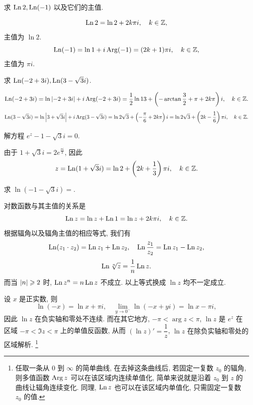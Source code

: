 \begin{example}
  求 $\operatorname{Ln} 2,\operatorname{Ln}(-1)$ 以及它们的主值.
\end{example}

\begin{solution}
  \[\operatorname{Ln}2=\ln2+2k\pi i,\quad k\in{\mathbb{Z}},\]
  主值为 $\ln 2$.
  \[\operatorname{Ln}(-1)=\ln1+i\operatorname{Arg}(-1)=(2k+1)\pi i,\quad k\in{\mathbb{Z}},\]
  主值为 $\pi i$.
\end{solution}

\begin{example}
求 $\operatorname{Ln}(-2+3i),\operatorname{Ln}(3-\sqrt3 i)$.
\end{example}

\begin{solution}
  \[
    \operatorname{Ln}(-2+3i)=\ln\left|-2+3i\right|+i\operatorname{Arg}(-2+3i)
      =\frac 12\ln 13+\left(-\arctan\frac 32+\pi+2k\pi\right)i,
      \quad k\in{\mathbb{Z}}.
  \]
  \[
    \operatorname{Ln}(3-\sqrt3i)=\ln\left|3+\sqrt 3i\right|+i\operatorname{Arg}(3-\sqrt 3i)
      =\ln 2\sqrt 3+\left(-\frac\pi6+2k\pi\right)i
      =\ln 2\sqrt 3+\left(2k-\frac16\right)\pi i,
      \quad k\in{\mathbb{Z}}.
  \]
\end{solution}

\begin{example}
  解方程 $e^z-1-\sqrt 3i=0$.
\end{example}

\begin{solution}
  由于 $1+\sqrt 3 i=2e^{\frac{\pi i}3}$, 因此
  \[z=\operatorname{Ln}(1+\sqrt 3i)=\ln 2+\left(2k+\frac13\right)\pi i,\quad k\in{\mathbb{Z}}.\]
\end{solution}

\begin{exercise}
  求 $\ln(-1-\sqrt3 i)=$\fillblank[2cm][3mm]{}.
\end{exercise}

对数函数与其主值的关系是
\[\operatorname{Ln} z=\ln z+\operatorname{Ln} 1=\ln z+2k\pi i,\quad k\in{\mathbb{Z}}.\]
根据辐角以及辐角主值的相应等式, 我们有
\[\operatorname{Ln}(z_1\cdot z_2)=\operatorname{Ln} z_1+\operatorname{Ln} z_2,\quad
  \operatorname{Ln}\frac{z_1}{z_2}=\operatorname{Ln} z_1-\operatorname{Ln} z_2,\]
\[\operatorname{Ln} \sqrt[n]z=\dfrac1n\operatorname{Ln} z.\]
而当 $\left|n\right|\geqslant 2$ 时, \alert{$\operatorname{Ln} z^n=n\operatorname{Ln} z$ 不成立}.
以上等式换成 $\ln z$ 均不一定成立.


设 $x$ 是正实数, 则
\[\ln (-x)=\ln x+\pi i,\quad
  \lim_{y\to0^-}\ln (-x+yi)=\ln x-\pi i,\]
因此 $\ln z$ 在负实轴和零处不连续.
而在其它地方, $-\pi<\arg z<\pi$, $\ln z$ 是 $e^z$ 在区域 $-\pi<\Im z<\pi$ 上的单值反函数, 
从而 \alert{$(\ln z)'=\dfrac 1z$}, \alert{$\ln z$ 在除负实轴和零处的区域解析}.
\footnote{任取一条从 $0$ 到 $\infty$ 的简单曲线, 在去掉这条曲线后, 若固定一复数 $z_0$ 的辐角, 则多值函数 $\operatorname{Arg} z$ 可以在该区域内连续单值化, 简单来说就是沿着 $z_0$ 到 $z$ 的曲线让辐角连续变化. 同理, $\operatorname{Ln} z$ 也可以在该区域内单值化, 只需固定一复数 $z_0$ 的值.}

